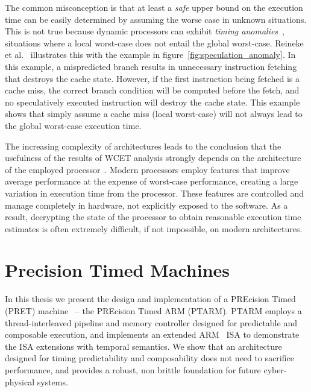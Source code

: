 The common misconception is that at least a \emph{safe} upper bound on the execution time can be easily determined by assuming the worse case in unknown situations.
This is not true because dynamic processors can exhibit \emph{timing anomalies}~\cite{Reineke06adefinition,Lundqvist1999}, situations where a local worst-case does not entail the global worst-case.
Reineke et al.~\cite{Reineke06adefinition} illustrates this with the example in figure~\ref{fig:speculation_anomaly}.
In this example, a mispredicted branch results in unnecessary instruction fetching that destroys the cache state. 
However, if the first instruction being fetched is a cache miss, the correct branch condition will be computed before the fetch, and no speculatively executed instruction will destroy the cache state. 
This example shows that simply assume a cache miss (local worst-case) will not always lead to the global worst-case execution time.    

The increasing complexity of architectures leads to the conclusion that the usefulness of the results of WCET analysis strongly depends on the architecture of the employed processor~\cite{Heckmann2003processor}.
Modern processors employ features that improve average performance at the expense of worst-case performance, creating a large variation in execution time from the processor. 
These features are controlled and manage completely in hardware, not explicitly exposed to the software.
As a result, decrypting the state of the processor to obtain reasonable execution time estimates is often extremely difficult, if not impossible, on modern architectures.   

\section{Precision Timed Machines}
In this thesis we present the design and implementation of a PREcision Timed (PRET) machine~\cite{edwards2007case} -- the PREcision Timed ARM (PTARM).
PTARM employs a thread-interleaved pipeline and memory controller designed for predictable and composable execution, and implements an extended ARM~\cite{armrefman} ISA to demonstrate the ISA extensions with temporal semantics.
We show that an architecture designed for timing predictability and composability does not need to sacrifice performance, and provides a robust, non brittle foundation for future cyber-physical systems.       
 
